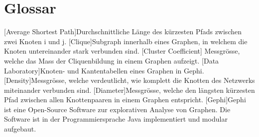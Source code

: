 \chapter*{Glossar}

\begin{acronym}
    [Average Shortest Path]{Durchschnittliche Länge des kürzesten Pfads zwischen zwei Knoten i und j.}
    [Clique]{Subgraph innerhalb eines Graphen, in welchem die Knoten untereinander stark verbunden sind.}
    [Cluster Coefficient] Messgrösse, welche das Mass der Cliquenbildung in einem Graphen aufzeigt.
    [Data Laboratory]{Knoten- und Kantentabellen eines Graphen in Gephi.}
    [Density]{Messgrösse, welche verdeutlicht, wie komplett die Knotten des Netzwerks miteinander verbunden sind.}
    [Diameter]{Messgrösse, welche den längsten kürzesten Pfad zwischen allen Knottenpaaren in einem Graphen entspricht.}
    [Gephi]{Gephi ist eine Open-Source Software zur explorativen
    Analyse von Graphen. Die Software ist in der Programmiersprache Java implementiert
    und modular aufgebaut.}
\end{acronym}
